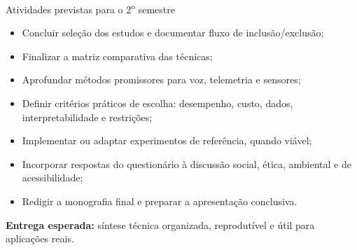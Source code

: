 \documentclass[aspectratio=1610,11pt]{beamer}
\begin{document}
\begin{frame}{Atividades previstas para o 2\textsuperscript{o} semestre}
    \hypertarget{fr-segundo-semestre}{}
    \begin{itemize}
        \item Concluir seleção dos estudos e documentar fluxo de inclusão/exclusão;
        \item Finalizar a matriz comparativa das técnicas;
        \item Aprofundar métodos promissores para voz, telemetria e sensores;
        \item Definir critérios práticos de escolha: desempenho, custo, dados, interpretabilidade e restrições;
        \item Implementar ou adaptar experimentos de referência, quando viável;
        \item Incorporar respostas do questionário à discussão social, ética, ambiental e de acessibilidade;
        \item Redigir a monografia final e preparar a apresentação conclusiva.
    \end{itemize}

    \vspace{0.2cm}
    \centering
    \textbf{Entrega esperada:} síntese técnica organizada, reprodutível e útil para aplicações reais.
\end{frame}
\end{document}
